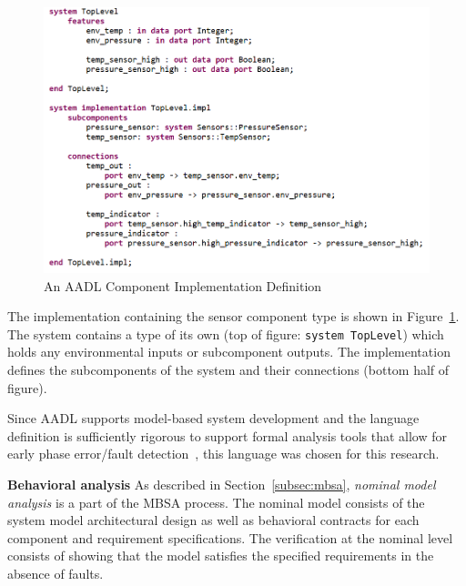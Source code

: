 \begin{figure}[h!]
	\begin{center}
	\includegraphics[width=1.0\textwidth]{images/aadlImplementation.png}
	\caption{An AADL Component Implementation Definition}
	\label{fig:aadlImplementation}
	\end{center}
\end{figure}

The implementation containing the sensor component type is shown in Figure~\ref{fig:aadlImplementation}. The system contains a type of its own (top of figure: \texttt{system TopLevel}) which holds any environmental inputs or subcomponent outputs. The implementation defines the subcomponents of the system and their connections (bottom half of figure). 

Since AADL supports model-based system development and the language definition is sufficiently rigorous to support formal analysis tools that allow for early phase error/fault detection~\cite{FeilerModelBasedEngineering2012}, this language was chosen for this research. 

\textbf{Behavioral analysis} As described in Section~\ref{subsec:mbsa}, {\em nominal model analysis} is a part of the MBSA process. The nominal model consists of the system model architectural design as well as behavioral contracts for each component and requirement specifications. The verification at the nominal level consists of showing that the model satisfies the specified requirements in the absence of faults. 

